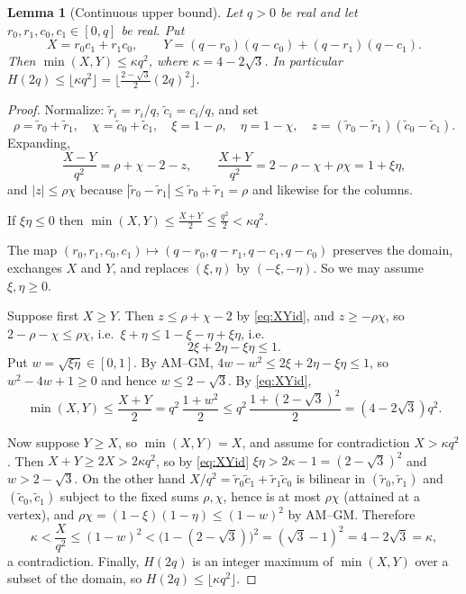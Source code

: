 \documentclass[11pt]{amsart}
\newtheorem{lemma}[theorem]{Lemma}
\theoremstyle{definition}
\theoremstyle{remark}
\begin{document}
\begin{lemma}[Continuous upper bound]\label{lem:Hupper}
Let $q>0$ be real and let $r_0,r_1,c_0,c_1\in[0,q]$ be real. Put
\[
X=r_0c_1+r_1c_0,\qquad Y=(q-r_0)(q-c_0)+(q-r_1)(q-c_1).
\]
Then $\min(X,Y)\le\kappa q^2$, where $\kappa=4-2\sqrt3$. In particular $H(2q)\le\lfloor\kappa q^2\rfloor=\bigl\lfloor\tfrac{2-\sqrt3}{2}(2q)^2\bigr\rfloor$.
\end{lemma}

\begin{proof}
Normalize: $\tilde r_i=r_i/q$, $\tilde c_i=c_i/q$, and set
\[
\rho=\tilde r_0+\tilde r_1,\quad \chi=\tilde c_0+\tilde c_1,\quad
\xi=1-\rho,\quad\eta=1-\chi,\quad
z=(\tilde r_0-\tilde r_1)(\tilde c_0-\tilde c_1).
\]
Expanding,
\begin{equation}\label{eq:XYid}
\frac{X-Y}{q^2}=\rho+\chi-2-z,
\qquad
\frac{X+Y}{q^2}=2-\rho-\chi+\rho\chi=1+\xi\eta ,
\end{equation}
and $|z|\le\rho\chi$ because $|\tilde r_0-\tilde r_1|\le\tilde r_0+\tilde r_1=\rho$ and likewise for the columns.

If $\xi\eta\le0$ then $\min(X,Y)\le\frac{X+Y}{2}\le\frac{q^2}{2}<\kappa q^2$.

The map $(r_0,r_1,c_0,c_1)\mapsto(q-r_0,q-r_1,q-c_1,q-c_0)$ preserves the domain, exchanges $X$ and $Y$, and replaces $(\xi,\eta)$ by $(-\xi,-\eta)$. So we may assume $\xi,\eta\ge0$.

Suppose first $X\ge Y$. Then $z\le\rho+\chi-2$ by \eqref{eq:XYid}, and $z\ge-\rho\chi$, so $2-\rho-\chi\le\rho\chi$, i.e.\ $\xi+\eta\le1-\xi-\eta+\xi\eta$, i.e.
\begin{equation}\label{eq:xieta}
2\xi+2\eta-\xi\eta\le1 .
\end{equation}
Put $w=\sqrt{\xi\eta}\in[0,1]$. By AM--GM, $4w-w^2\le2\xi+2\eta-\xi\eta\le1$, so $w^2-4w+1\ge0$ and hence $w\le2-\sqrt3$. By \eqref{eq:XYid},
\[
\min(X,Y)\le\frac{X+Y}{2}=q^2\,\frac{1+w^2}{2}\le q^2\,\frac{1+(2-\sqrt3)^2}{2}=(4-2\sqrt3)q^2 .
\]

Now suppose $Y\ge X$, so $\min(X,Y)=X$, and assume for contradiction $X>\kappa q^2$. Then $X+Y\ge2X>2\kappa q^2$, so by \eqref{eq:XYid} $\xi\eta>2\kappa-1=(2-\sqrt3)^2$ and $w>2-\sqrt3$. On the other hand $X/q^2=\tilde r_0\tilde c_1+\tilde r_1\tilde c_0$ is bilinear in $(\tilde r_0,\tilde r_1)$ and $(\tilde c_0,\tilde c_1)$ subject to the fixed sums $\rho,\chi$, hence is at most $\rho\chi$ (attained at a vertex), and $\rho\chi=(1-\xi)(1-\eta)\le(1-w)^2$ by AM--GM. Therefore
\[
\kappa<\frac{X}{q^2}\le(1-w)^2<\bigl(1-(2-\sqrt3)\bigr)^2=(\sqrt3-1)^2=4-2\sqrt3=\kappa,
\]
a contradiction. Finally, $H(2q)$ is an integer maximum of $\min(X,Y)$ over a subset of the domain, so $H(2q)\le\lfloor\kappa q^2\rfloor$.
\end{proof}
\end{document}
